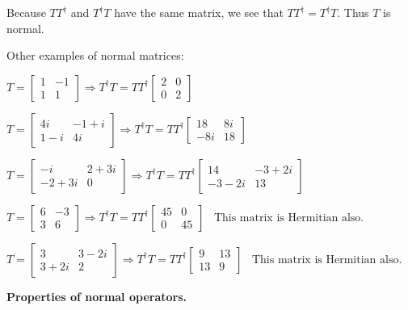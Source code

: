 \documentclass{article}
\begin{document}
Because $TT^{\dag}$ and $T^\dag T$ have the same matrix, we see that $TT^{\dag} = T^\dag T$. Thus $T$ is normal.

\skl

Other examples of normal matrices:

$
T = \begin{bmatrix}
1 & -1 \\ 1 & 1
\end{bmatrix}
\Rightarrow T^\dag T = TT^\dag
\begin{bmatrix}
2 & 0 \\ 0 &2
\end{bmatrix}
$

$
T = \begin{bmatrix}
4i & -1 + i \\ 1-i & 4i
\end{bmatrix}
\Rightarrow T^\dag T = TT^\dag
\begin{bmatrix}
18 & 8i \\ -8i & 18
\end{bmatrix}
$


$
T = \begin{bmatrix}
-i & 2 + 3i \\ -2+3i & 0
\end{bmatrix}
\Rightarrow T^\dag T = TT^\dag
\begin{bmatrix}
14 & -3+2i \\ -3-2i & 13
\end{bmatrix}
$


$
T = \begin{bmatrix}
6 & -3 \\ 3 & 6
\end{bmatrix}
\Rightarrow T^\dag T = TT^\dag
\begin{bmatrix}
45 & 0 \\ 0 & 45
\end{bmatrix} \;\;\; \text{This matrix is Hermitian also.}
$


$
T = \begin{bmatrix}
3 & 3-2i \\ 3+2i & 2
\end{bmatrix}
\Rightarrow T^\dag T = TT^\dag
\begin{bmatrix}
9 & 13 \\ 13 & 9
\end{bmatrix} \;\;\; \text{This matrix is Hermitian also.}
$


\skl
\skl

\textbf{Properties of normal operators.}
\end{document}

